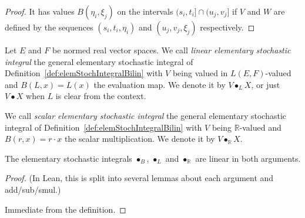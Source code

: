 \begin{proof}
  \leanok
It has values $B(\eta_i, \xi_j)$ on the intervals $(s_i, t_i] \cap (u_j, v_j]$ if $V$ and $W$ are defined by the sequences $(s_i, t_i, \eta_i)$ and $(u_j, v_j, \xi_j)$ respectively.
\end{proof}


\begin{definition}\label{def:elemStochIntegralLinear}
  \leanok
Let $E$ and $F$ be normed real vector spaces.
We call \emph{linear elementary stochastic integral} the general elementary stochastic integral of Definition~\ref{def:elemStochIntegralBilin} with $V$ being valued in $L(E, F)$-valued and $B(L, x) = L(x)$ the evaluation map.
We denote it by $V \bullet_L X$,
or just $V \bullet X$ when $L$ is clear from the context.
\end{definition}


\begin{definition}\label{def:elemStochIntegral}
We call \emph{scalar elementary stochastic integral} the general elementary stochastic integral of Definition~\ref{def:elemStochIntegralBilin} with $V$ being $\mathbb{R}$-valued and $B(r, x) = r \cdot x$ the scalar multiplication.
We denote it by $V \bullet_{\mathbb{R}} X$.
\end{definition}


\begin{lemma}\label{lem:elemStochIntegral_linear}
  \leanok
The elementary stochastic integrals $\bullet_B$, $\bullet_L$ and $\bullet_{\mathbb{R}}$ are linear in both arguments.
\end{lemma}

\begin{proof}
  \leanok
(In Lean, this is split into several lemmas about each argument and add/sub/smul.)

Immediate from the definition.
\end{proof}


